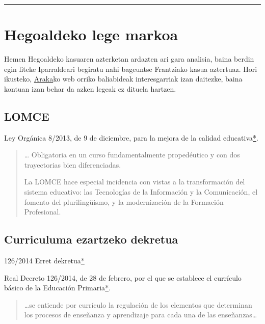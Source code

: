 \documentclass[]{book}
\begin{document}
\begin{center}\rule{0.5\linewidth}{\linethickness}\end{center}

\hypertarget{hegoaldeko-lege-markoa}{%
\section{Hegoaldeko lege markoa}\label{hegoaldeko-lege-markoa}}

Hemen Hegoaldeko kasuaren azterketan ardazten ari gara analisia, baina berdin egin liteke Iparraldeari begiratu nahi bageuntse Frantziako kasua aztertuaz. Hori ikusteko, \href{http://www.vc.ehu.es/araka/orri12.htm}{Araka}ko web orriko baliabideak interesgarriak izan daitezke, baina kontuan izan behar da azken legeak ez dituela hartzen.

\hypertarget{lomce}{%
\subsection{LOMCE}\label{lomce}}

Ley Orgánica 8/2013, de 9 de diciembre, para la mejora de la calidad educativa\href{https://www.boe.es/buscar/act.php?id=BOE-A-2013-12886}{*}.

\begin{quote}
\ldots{} Obligatoria en un curso fundamentalmente propedéutico y con dos trayectorias bien diferenciadas.

La LOMCE hace especial incidencia con vistas a la transformación del sistema educativo: las Tecnologías de la Información y la Comunicación, el fomento del plurilingüismo, y la modernización de la Formación Profesional.
\end{quote}

\hypertarget{curriculuma-ezartzeko-dekretua}{%
\subsection{Curriculuma ezartzeko dekretua}\label{curriculuma-ezartzeko-dekretua}}

126/2014 Erret dekretua\href{https://www.boe.es/buscar/pdf/2014/BOE-A-2014-2222-consolidado.pdf}{*}

Real Decreto 126/2014, de 28 de febrero, por el que se establece el currículo básico de la Educación Primaria\href{https://www.boe.es/buscar/pdf/2014/BOE-A-2014-2222-consolidado.pdf}{*}.

\begin{quote}
\ldots{}se entiende por currículo la regulación de los elementos que determinan los procesos de enseñanza y aprendizaje para cada una de las enseñanzas\ldots{}
\end{quote}
\end{document}
